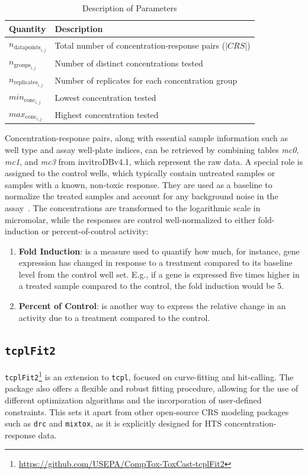 \begin{table}
    \centering
    \caption{Description of Parameters}
    \label{tab:concentrations_quantities}
    \begin{tabular}{ll}
        \toprule
        \textbf{Quantity} & \textbf{Description} \\
        \midrule
        $n_{\text{datapoints}_{i,j}}$ & Total number of concentration-response pairs ($|CRS|$) \\
        $n_{\text{groups}_{i,j}}$ & Number of distinct concentrations tested \\
        $n_{\text{replicates}_{i,j}}$ & Number of replicates for each concentration group \\
        $min_{\text{conc}_{i,j}}$ & Lowest concentration tested \\
        $max_{\text{conc}_{i,j}}$ & Highest concentration tested \\
        \bottomrule
    \end{tabular}
\end{table}

Concentration-response pairs, along with essential sample information such as well type and assay well-plate indices, can be retrieved by combining tables \emph{mc0}, \emph{mc1}, and \emph{mc3} from invitroDBv4.1, which represent the raw data. A special role is assigned to the control wells, which typically contain untreated samples or samples with a known, non-toxic response. They are used as a baseline to normalize the treated samples and account for any background noise in the assay~\cite{sheffield2021}. The concentrations are transformed to the logarithmic scale in micromolar, while the responses are control well-normalized to either fold-induction or percent-of-control activity:

\begin{enumerate}
    \item \textbf{Fold Induction}: is a measure used to quantify how much, for instance, gene expression has changed in response to a treatment compared to its baseline level from the control well set. E.g., if a gene is expressed five times higher in a treated sample compared to the control, the fold induction would be 5.
    \item \textbf{Percent of Control}: is another way to express the relative change in an activity due to a treatment compared to the control.
\end{enumerate}


\subsection{\texttt{tcplFit2}}\label{sec:tcplfit2}
\texttt{tcplFit2}\footnote{\url{https://github.com/USEPA/CompTox-ToxCast-tcplFit2}} is an extension to \texttt{tcpl}, focused on curve-fitting and hit-calling. The package also offers a flexible and robust fitting procedure, allowing for the use of different optimization algorithms and the incorporation of user-defined constraints. This sets it apart from other open-source CRS modeling packages such as \texttt{drc} and \texttt{mixtox}, as it is explicitly designed for HTS concentration-response data.

